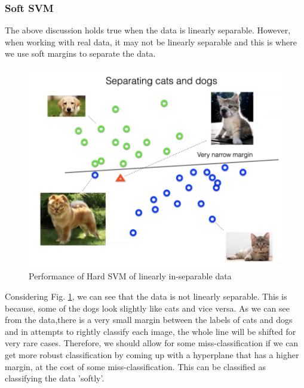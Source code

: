 \documentclass[11pt]{article}
\begin{document}

\subsubsection{Soft SVM}

The above discussion holds true when the data is linearly separable. However, when working with real data, it may not be linearly separable and this is where we use soft margins to separate the data. 

\begin{figure}[H]
\begin{center}
\includegraphics[scale=0.25]{figures/HardSVM.png}
\end{center}
\caption{Performance of Hard SVM of linearly in-separable data}
\label{fig:HardSVMPerf}
\end{figure}

Considering Fig. \ref{fig:HardSVMPerf}, we can see that the data is not linearly separable.  This is because, some of the dogs look slightly like cats and vice versa. As we can see from the data,there is a very small margin between the labels of cats and dogs and in attempts to rightly classify each image, the whole line will be shifted for very rare cases. Therefore, we should allow for some miss-classification if we can get more robust classification by coming up with a hyperplane that has a higher margin, at the cost of some miss-classification. This can be classified as classifying the data 'softly'.
\end{document}
